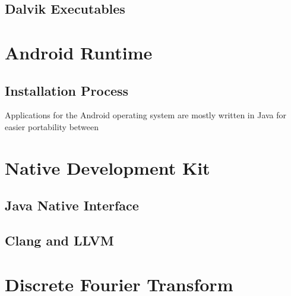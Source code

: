 
\subsection{Dalvik Executables}



\section{Android Runtime}



\subsection{Installation Process}


Applications for the Android operating system are mostly written in Java for easier portability between \cite[p.~33]{nolan2012decompiling}

\section{Native Development Kit}

\subsection{Java Native Interface}
\subsection{Clang and LLVM}

\section{Discrete Fourier Transform}
